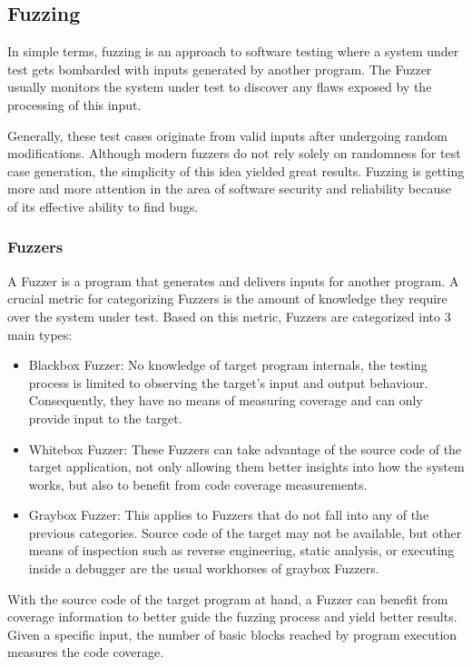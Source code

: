 \subsection{Fuzzing}

In simple terms, fuzzing is an approach to software testing where a system under test gets bombarded with inputs generated by another program.
The Fuzzer usually monitors the system under test to discover any flaws exposed by the processing of this input\cite{mcnallyFuzzingStateArt2012}.

Generally, these test cases originate from valid inputs after undergoing random modifications. Although modern
fuzzers do not rely solely on randomness for test case generation, the simplicity of this idea yielded great
results. Fuzzing is getting more and more attention in the area of software security and reliability because of its effective
ability to find bugs\cite{liangFuzzingStateArt2018}.

\subsubsection{Fuzzers}

A Fuzzer is a program that generates and delivers inputs for another program. A crucial metric for categorizing Fuzzers is
the amount of knowledge they require over the system under test. Based on this metric, Fuzzers are categorized into 3 main types\cite{mcnallyFuzzingStateArt2012}:

\begin{itemize}
    \item Blackbox Fuzzer: No knowledge of target program internals, the testing process is limited to observing the target's input and output behaviour. Consequently, they have no means of measuring coverage and can only provide input to the target.
    \item Whitebox Fuzzer: These Fuzzers can take advantage of the source code of the target application, not only allowing them better insights into how the system works, but also to benefit from code coverage measurements.
    \item Graybox Fuzzer: This applies to Fuzzers that do not fall into any of the previous categories. Source code of the target may not be available, but other means of inspection such as reverse engineering, static analysis, or executing inside a debugger are the usual workhorses of graybox Fuzzers.
\end{itemize}

With the source code of the target program at hand, a Fuzzer can benefit from coverage information to
better guide the fuzzing process and yield better results. Given a specific input,
the number of basic blocks reached by program execution measures the code coverage.

